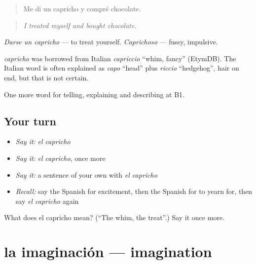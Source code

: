 \begin{quote}
Me di un capricho y compré chocolate.
\end{quote}

\begin{quote}
\emph{I treated myself and bought chocolate.}
\end{quote}

\emph{Darse un capricho} — to treat yourself. \emph{Caprichoso} — fussy, impulsive.

\begin{cousinweb}
\emph{capricho} was borrowed from Italian \emph{capriccio} \textquotedblleft{}whim, fancy\textquotedblright{} (EtymDB). The Italian word is often explained as \emph{capo} \textquotedblleft{}head\textquotedblright{} plus \emph{riccio} \textquotedblleft{}hedgehog\textquotedblright{}, hair on end, but that is not certain.
\end{cousinweb}

\begin{grammarlens}[title={What you've built}]
One more word for telling, explaining and describing at B1.
\end{grammarlens}

\subsection*{Your turn}
\begin{itemize}
\raggedright
  \item \emph{Say it:} \emph{el capricho}
  \item \emph{Say it:} \emph{el capricho}, once more
  \item \emph{Say it:} a sentence of your own with \emph{el capricho}
  \item \emph{Recall:} say the Spanish for excitement, then the Spanish for to yearn for, then say \emph{el capricho} again
\end{itemize}

\begin{tcolorbox}[breakable,colback=teal!4,colframe=teal!35!black,title={Before you move on}]
What does el capricho mean? (\textquotedblleft{}The whim, the treat\textquotedblright{}.) Say it once more.
\end{tcolorbox}
\section[la imaginación]{la imaginación — imagination}

\label{lesson:ES-C765-imaginacion}



